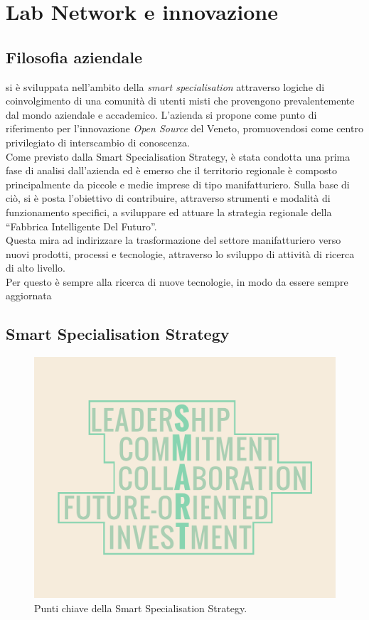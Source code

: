 \section{Lab Network e innovazione}
\subsection{Filosofia aziendale}
\lab{} si è sviluppata nell'ambito della \textit{smart specialisation} attraverso logiche di coinvolgimento di una comunità di utenti misti che provengono prevalentemente dal mondo aziendale e accademico. 
L'azienda si propone come punto di riferimento per l'innovazione \textit{Open Source} del Veneto, promuovendosi come centro privilegiato di interscambio di conoscenza.\\
Come previsto dalla Smart Specialisation Strategy, è stata condotta una prima fase di analisi dall'azienda ed è emerso che il territorio regionale è composto principalmente da piccole e medie imprese di tipo manifatturiero. Sulla base di ciò, \lab{} si è posta l'obiettivo di contribuire, attraverso strumenti e modalità di funzionamento specifici, a sviluppare ed attuare la strategia regionale della ``Fabbrica Intelligente Del Futuro''.\\
Questa mira ad indirizzare la trasformazione del settore manifatturiero verso nuovi prodotti, processi e tecnologie, attraverso lo sviluppo di attività di ricerca di alto livello.\\
Per questo \lab{} è sempre alla ricerca di nuove tecnologie, in modo da essere sempre aggiornata 

\subsection{Smart Specialisation Strategy}
\begin{figure}[H]
	\begin{center}
	\includegraphics[scale=0.15]{immagini/SMART.png}
	\caption{Punti chiave della Smart Specialisation Strategy.}
	\end{center}
\end{figure}

